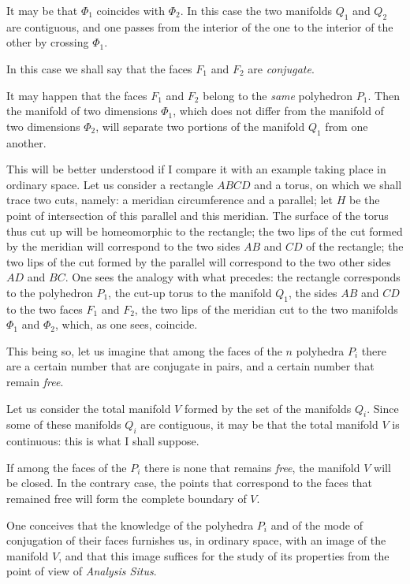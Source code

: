 \documentclass{article}
\begin{document}
It may be that $\Phi_{1}$ coincides with $\Phi_{2}$. In this case the two manifolds $Q_{1}$ and $Q_{2}$ are contiguous, and one passes from the interior of the one to the interior of the other by crossing $\Phi_{1}$.

In this case we shall say that the faces $F_{1}$ and $F_{2}$ are \emph{conjugate}.

It may happen that the faces $F_{1}$ and $F_{2}$ belong to the \emph{same} polyhedron $P_{1}$. Then the manifold of two dimensions $\Phi_{1}$, which does not differ from the manifold of two dimensions $\Phi_{2}$, will separate two portions of the manifold $Q_{1}$ from one another.

This will be better understood if I compare it with an example taking place in ordinary space. Let us consider a rectangle $ABCD$ and a torus, on which we shall trace two cuts, namely: a meridian circumference and a parallel; let $H$ be the point of intersection of this parallel and this meridian. The surface of the torus thus cut up will be homeomorphic to the rectangle; the two lips of the cut formed by the meridian will correspond to the two sides $AB$ and $CD$ of the rectangle; the two lips of the cut formed by the parallel will correspond to the two other sides $AD$ and $BC$. One sees the analogy with what precedes: the rectangle corresponds to the polyhedron $P_{1}$, the cut-up torus to the manifold $Q_{1}$, the sides $AB$ and $CD$ to the two faces $F_{1}$ and $F_{2}$, the two lips of the meridian cut to the two manifolds $\Phi_{1}$ and $\Phi_{2}$, which, as one sees, coincide.

This being so, let us imagine that among the faces of the $n$ polyhedra $P_{i}$ there are
a certain number that are conjugate in pairs, and a certain number that remain \emph{free}.

Let us consider the total manifold $V$ formed by the set of the manifolds $Q_{i}$. Since some of these manifolds $Q_{i}$ are contiguous, it may be that the total manifold $V$ is continuous: this is what I shall suppose.

If among the faces of the $P_{i}$ there is none that remains \emph{free}, the manifold $V$ will be closed. In the contrary case, the points that correspond to the faces that remained free will form the complete boundary of $V$.

One conceives that the knowledge of the polyhedra $P_{i}$ and of the mode of conjugation of their faces furnishes us, in ordinary space, with an image of the manifold $V$, and that this image suffices for the study of its properties from the point of view of \emph{Analysis Situs}.
\end{document}
